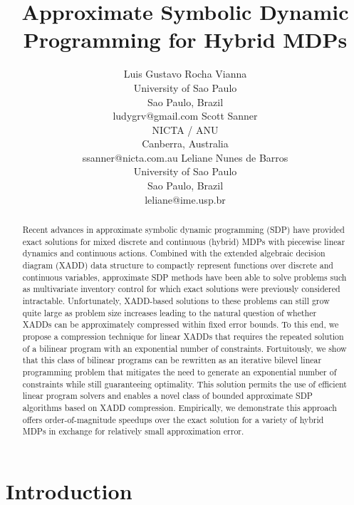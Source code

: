 \documentclass{article}
\title{	Approximate Symbolic Dynamic Programming for Hybrid MDPs }
\author{Luis Gustavo Rocha Vianna\\
University of Sao Paulo\\
Sao Paulo, Brazil \\
ludygrv@gmail.com
\And
Scott Sanner \\
NICTA / ANU\\
Canberra, Australia \\
ssanner@nicta.com.au
\And
Leliane Nunes de Barros\\
University of Sao Paulo\\
Sao Paulo, Brazil\\
leliane@ime.usp.br}
\begin{document}
\maketitle

\begin{abstract}
Recent advances in approximate symbolic dynamic programming (SDP) have 
provided exact solutions for mixed discrete and continuous (hybrid) 
MDPs with piecewise linear dynamics and continuous actions. Combined 
with the extended algebraic decision diagram (XADD) data structure to 
compactly represent functions over discrete and continuous variables, 
approximate SDP methods have been able to solve problems such as 
multivariate inventory control for which exact solutions were 
previously considered intractable. Unfortunately, XADD-based 
solutions to these problems can still grow quite large as problem size 
increases leading to the natural question of whether XADDs can be 
approximately compressed within fixed error bounds. To this end, we 
propose a compression technique for linear XADDs that requires the 
repeated solution of a bilinear program with an exponential number of 
constraints. Fortuitously, we show that this class of bilinear 
programs can be rewritten as an iterative bilevel linear programming 
problem that mitigates the need to generate an exponential number of 
constraints while still guaranteeing optimality. This solution 
permits the use of efficient linear program solvers and enables a 
novel class of bounded approximate SDP algorithms based on XADD 
compression. Empirically, we demonstrate this approach offers 
order-of-magnitude speedups over the exact solution for a variety of 
hybrid MDPs in exchange for relatively small approximation error.
\end{abstract}

\section{Introduction}

\cite{sanner_uai11}





\end{document}
